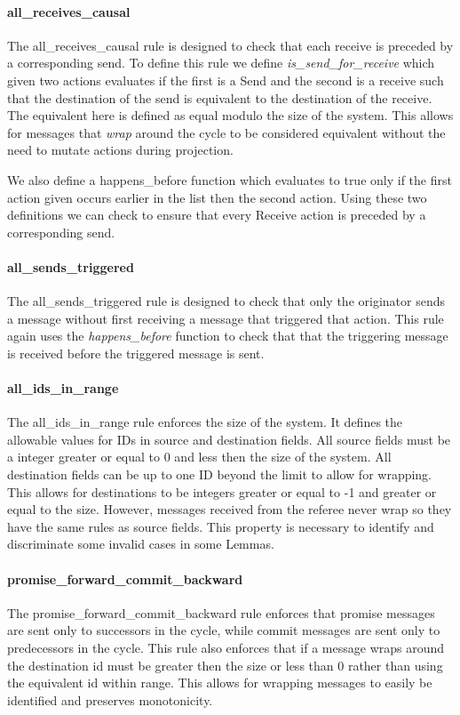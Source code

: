 \documentclass[runningheads]{llncs}
\begin{document}
\paragraph{all\_receives\_causal}
The all\_receives\_causal rule is designed to check that each receive is preceded by a corresponding send. To define this rule we define \sloppy \emph{is\_send\_for\_receive} which given two actions evaluates if the first is a Send and the second is a receive such that the destination of the send is equivalent to the destination of the receive. The equivalent here is defined as equal modulo the size of the system. This allows for messages that \emph{wrap} around the cycle to be considered equivalent without the need to mutate actions during projection. 

We also define a happens\_before function which evaluates to true only if the first action given occurs earlier in the list then the second action. 
Using these two definitions we can check to ensure that every Receive action is preceded by a corresponding send. 

\paragraph{all\_sends\_triggered}
The all\_sends\_triggered rule is designed to check that only the originator sends a message without first receiving a message that triggered that action. This rule again uses the \emph{happens\_before} function to check that that the triggering message is received before the triggered message is sent. 

\paragraph{all\_ids\_in\_range}
The all\_ids\_in\_range rule enforces the size of the system. It defines the allowable values for IDs in source and destination fields. All source fields must be a integer greater or equal to 0 and less then the size of the system. All destination fields can be up to one ID beyond the limit to allow for wrapping. This allows for destinations to be integers greater or equal to -1 and greater or equal to the size. However, messages received from the referee never wrap so they have the same rules as source fields. This property is necessary to identify and discriminate some invalid cases in some Lemmas. 

\paragraph{promise\_forward\_commit\_backward}
The promise\_forward\_commit\_backward rule enforces that promise messages are sent only to successors in the cycle, while commit messages are sent only to predecessors in the cycle. This rule also enforces that if a message wraps around the destination id must be greater then the size or less than 0 rather than using the equivalent id within range. This allows for wrapping messages to easily be identified and preserves monotonicity.
\end{document}
